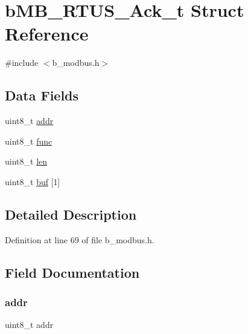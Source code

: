 \hypertarget{structb_m_b___r_t_u_s___ack__t}{}\section{b\+M\+B\+\_\+\+R\+T\+U\+S\+\_\+\+Ack\+\_\+t Struct Reference}
\label{structb_m_b___r_t_u_s___ack__t}


{\ttfamily \#include $<$b\+\_\+modbus.\+h$>$}

\subsection*{Data Fields}
\begin{DoxyCompactItemize}
\item 
uint8\+\_\+t \mbox{\hyperlink{structb_m_b___r_t_u_s___ack__t_af5105c72a61e60d3b44670de20e0c3fb}{addr}}
\item 
uint8\+\_\+t \mbox{\hyperlink{structb_m_b___r_t_u_s___ack__t_ac6b64f60b8100dc86a10a524158c21ce}{func}}
\item 
uint8\+\_\+t \mbox{\hyperlink{structb_m_b___r_t_u_s___ack__t_a5723e60ffd628510c699eddbce90be23}{len}}
\item 
uint8\+\_\+t \mbox{\hyperlink{structb_m_b___r_t_u_s___ack__t_ad8b5a87c8c7c60e3c795c91b0549f05b}{buf}} \mbox{[}1\mbox{]}
\end{DoxyCompactItemize}


\subsection{Detailed Description}


Definition at line 69 of file b\+\_\+modbus.\+h.



\subsection{Field Documentation}
\mbox{\label{structb_m_b___r_t_u_s___ack__t_af5105c72a61e60d3b44670de20e0c3fb}} 
\subsubsection{\texorpdfstring{addr}{addr}}
{\footnotesize\ttfamily uint8\+\_\+t addr}



